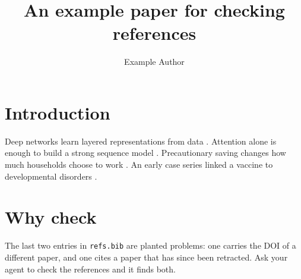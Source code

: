 \documentclass[11pt]{article}
\title{An example paper for checking references}
\author{Example Author}
\date{}
\begin{document}
\maketitle

\section{Introduction}
Deep networks learn layered representations from data \cite{lecun2015deep}.
Attention alone is enough to build a strong sequence model \cite{vaswani2017attention}.
Precautionary saving changes how much households choose to work \cite{pijoanmas2006}.
An early case series linked a vaccine to developmental disorders \cite{wakefield1998}.

\section{Why check}
The last two entries in \texttt{refs.bib} are planted problems: one carries the DOI of a
different paper, and one cites a paper that has since been retracted. Ask your agent to
check the references and it finds both.



\end{document}
